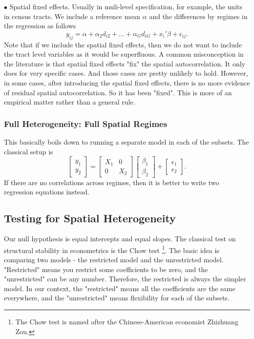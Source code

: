 \documentclass[11pt,a4paper]{amsart}
\theoremstyle{plain}
\theoremstyle{definition}
\begin{document}
$\bullet$ Spatial fixed effects. Usually in muli-level specification, for example, the units in census tracts. We include a reference mean $\alpha$ and the differences by regimes in the regression as follows
\[	y_{ij} = \alpha + \alpha_{2}d_{i2} + \dots + \alpha_{G}d_{iG} + x_{i}'\beta + \epsilon_{ij}.	\]
Note that if we include the spatial fixed effects, then we do not want to include the tract level variables as it would be superfluous. A common misconception in the literature is that spatial fixed effects "fix" the spatial autocorrelation. It only does for very specific cases. And those cases are pretty unlikely to hold. However, in some cases, after introducing the spatial fixed effects, there is no more evidence of residual spatial autocorrelation. So it has been "fixed". This is more of an empirical matter rather than a general rule. 

\subsubsection{Full Heterogeneity: Full Spatial Regimes}
This basically boils down to running a separate model in each of the subsets. The classical setup is 
\[	\begin{bmatrix}
	y_{1}\\
	y_{2}
\end{bmatrix} = \begin{bmatrix}
X_{1} & 0 \\
0 & X_{2}
\end{bmatrix} 
\begin{bmatrix}
	\beta_{1} \\
	\beta_{2}
\end{bmatrix} + 
\begin{bmatrix}
	\epsilon_{1}\\
	\epsilon_{2}
\end{bmatrix}.	\]
If there are no correlations across regimes, then it is better to write two regression equations instead.

\subsection{Testing for Spatial Heterogeneity}
 Our null hypothesis is equal intercepts and equal slopes.  The classical test on structural stability in econometrics is the Chow test \footnote{The Chow test is named after the Chinese-American economist Zhizhuang Zou.}. The basic idea is comparing two models - the restricted model and the unrestricted model. "Restricted" means you restrict some coefficients to be zero, and the "unrestricted" can be any number. Therefore, the restricted is always the simpler model. In our context, the "restricted" means all the coefficients are the same everywhere, and the "unrestricted" means flexibility for each of the subsets. 
 
\end{document}
